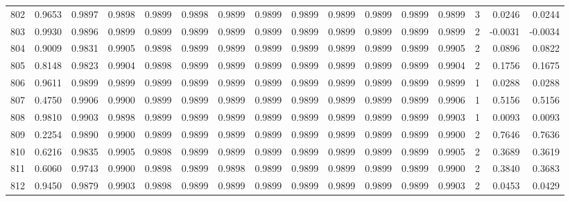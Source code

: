 \begin{tabular}{lrrrrrrrrrrrrrrr}
802 &      0.9653 &  0.9897 &  0.9898 &  0.9899 &  0.9898 &  0.9899 &  0.9899 &  0.9899 &  0.9899 &  0.9899 &   0.9899 &     0.9899 &      3 &                    0.0246 &                     0.0244 \\
803 &      0.9930 &  0.9896 &  0.9899 &  0.9899 &  0.9899 &  0.9899 &  0.9899 &  0.9899 &  0.9899 &  0.9899 &   0.9899 &     0.9899 &      2 &                   -0.0031 &                    -0.0034 \\
804 &      0.9009 &  0.9831 &  0.9905 &  0.9898 &  0.9899 &  0.9899 &  0.9899 &  0.9899 &  0.9899 &  0.9899 &   0.9899 &     0.9905 &      2 &                    0.0896 &                     0.0822 \\
805 &      0.8148 &  0.9823 &  0.9904 &  0.9898 &  0.9899 &  0.9899 &  0.9899 &  0.9899 &  0.9899 &  0.9899 &   0.9899 &     0.9904 &      2 &                    0.1756 &                     0.1675 \\
806 &      0.9611 &  0.9899 &  0.9899 &  0.9899 &  0.9899 &  0.9899 &  0.9899 &  0.9899 &  0.9899 &  0.9899 &   0.9899 &     0.9899 &      1 &                    0.0288 &                     0.0288 \\
807 &      0.4750 &  0.9906 &  0.9900 &  0.9899 &  0.9899 &  0.9899 &  0.9899 &  0.9899 &  0.9899 &  0.9899 &   0.9899 &     0.9906 &      1 &                    0.5156 &                     0.5156 \\
808 &      0.9810 &  0.9903 &  0.9898 &  0.9899 &  0.9899 &  0.9899 &  0.9899 &  0.9899 &  0.9899 &  0.9899 &   0.9899 &     0.9903 &      1 &                    0.0093 &                     0.0093 \\
809 &      0.2254 &  0.9890 &  0.9900 &  0.9899 &  0.9899 &  0.9899 &  0.9899 &  0.9899 &  0.9899 &  0.9899 &   0.9899 &     0.9900 &      2 &                    0.7646 &                     0.7636 \\
810 &      0.6216 &  0.9835 &  0.9905 &  0.9898 &  0.9899 &  0.9899 &  0.9899 &  0.9899 &  0.9899 &  0.9899 &   0.9899 &     0.9905 &      2 &                    0.3689 &                     0.3619 \\
811 &      0.6060 &  0.9743 &  0.9900 &  0.9898 &  0.9899 &  0.9898 &  0.9899 &  0.9899 &  0.9899 &  0.9899 &   0.9899 &     0.9900 &      2 &                    0.3840 &                     0.3683 \\
812 &      0.9450 &  0.9879 &  0.9903 &  0.9898 &  0.9899 &  0.9899 &  0.9899 &  0.9899 &  0.9899 &  0.9899 &   0.9899 &     0.9903 &      2 &                    0.0453 &                     0.0429 \\

\end{tabular}
